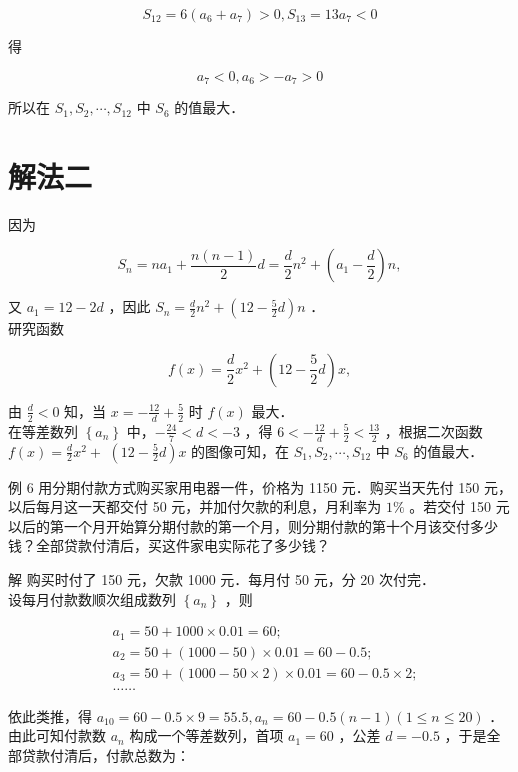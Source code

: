 \documentclass[10pt]{article}
\begin{document}
\[
S_{12}=6\left(a_{6}+a_{7}\right)>0, S_{13}=13 a_{7}<0
\]

得

\[
a_{7}<0, a_{6}>-a_{7}>0
\]

所以在 \(S_{1}, S_{2}, \cdots, S_{12}\) 中 \(S_{6}\) 的值最大．

\section*{解法二}
因为

\[
S_{n}=n a_{1}+\frac{n(n-1)}{2} d=\frac{d}{2} n^{2}+\left(a_{1}-\frac{d}{2}\right) n,
\]

又 \(a_{1}=12-2 d\) ，因此 \(S_{n}=\frac{d}{2} n^{2}+\left(12-\frac{5}{2} d\right) n\) ．\\
研究函数

\[
f(x)=\frac{d}{2} x^{2}+\left(12-\frac{5}{2} d\right) x,
\]

由 \(\frac{d}{2}<0\) 知，当 \(x=-\frac{12}{d}+\frac{5}{2}\) 时 \(f(x)\) 最大．\\
在等差数列 \(\left\{a_{n}\right\}\) 中，\(-\frac{24}{7}<d<-3\) ，得 \(6<-\frac{12}{d}+\frac{5}{2}<\frac{13}{2}\) ，根据二次函数 \(f(x)=\frac{d}{2} x^{2}+\) \(\left(12-\frac{5}{2} d\right) x\) 的图像可知，在 \(S_{1}, S_{2}, \cdots, S_{12}\) 中 \(S_{6}\) 的值最大．

例 6 用分期付款方式购买家用电器一件，价格为 1150 元．购买当天先付 150 元，以后每月这一天都交付 50 元，并加付欠款的利息，月利率为 \(1 \%\) 。若交付 150 元以后的第一个月开始算分期付款的第一个月，则分期付款的第十个月该交付多少钱？全部贷款付清后，买这件家电实际花了多少钱？

解 购买时付了 150 元，欠款 1000 元．每月付 50 元，分 20 次付完．\\
设每月付款数顺次组成数列 \(\left\{a_{n}\right\}\) ，则

\[
\begin{aligned}
& a_{1}=50+1000 \times 0.01=60 ; \\
& a_{2}=50+(1000-50) \times 0.01=60-0.5 ; \\
& a_{3}=50+(1000-50 \times 2) \times 0.01=60-0.5 \times 2 ; \\
& \ldots \ldots
\end{aligned}
\]

依此类推，得 \(a_{10}=60-0.5 \times 9=55.5, a_{n}=60-0.5(n-1)(1 \leqslant n \leqslant 20)\) ．\\
由此可知付款数 \(a_{n}\) 构成一个等差数列，首项 \(a_{1}=60\) ，公差 \(d=-0.5\) ，于是全部贷款付清后，付款总数为：
\end{document}
